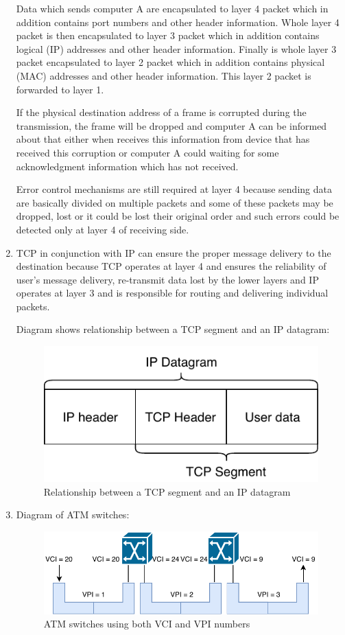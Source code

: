 \documentclass[a4paper, 11pt]{article}
\begin{document}
\begin{enumerate}
			Data which sends computer A are encapsulated to layer 4 packet which in addition contains port
			numbers and other header information. Whole layer 4 packet is then encapsulated to layer 3 packet
			which in addition contains logical (IP) addresses and other header information. Finally is whole
			layer 3 packet encapsulated to layer 2 packet which in addition contains physical (MAC) addresses
			and other header information. This layer 2 packet is forwarded to layer 1.

			If the physical destination address of a frame is corrupted during the transmission, the frame will
			be dropped and computer A can be informed about that either when receives this information from device
			that has received this corruption or computer A could waiting for some acknowledgment information which
			has not received.

			Error control mechanisms are still required at layer 4 because sending data are basically divided on multiple
			packets and some of these packets may be dropped, lost or it could be lost their original order and such errors
			could be detected only at layer 4 of receiving side.

		\item %
			TCP in conjunction with IP can ensure the proper message delivery to the destination because TCP operates at
			layer 4 and ensures the reliability of user's message delivery, re-transmit data lost by the lower layers and
			IP operates at layer 3 and is responsible for routing and delivering individual packets.

			Diagram shows relationship between a TCP segment and an IP datagram:
			\begin{figure}[H]
				\centering
				\includegraphics[width=0.4\linewidth]{inc/tcp_ip_relation.pdf}
				\caption{Relationship between a TCP segment and an IP datagram}
				\label{figure:tcp_ip_relation}
			\end{figure}

		\item %
			Diagram of ATM switches:
			\begin{figure}[H]
				\centering
				\includegraphics[width=0.7\linewidth]{inc/atm_switch.pdf}
				\caption{ATM switches using both VCI and VPI numbers}
				\label{figure:atm_switch}
			\end{figure}


\end{enumerate}
\end{document}
